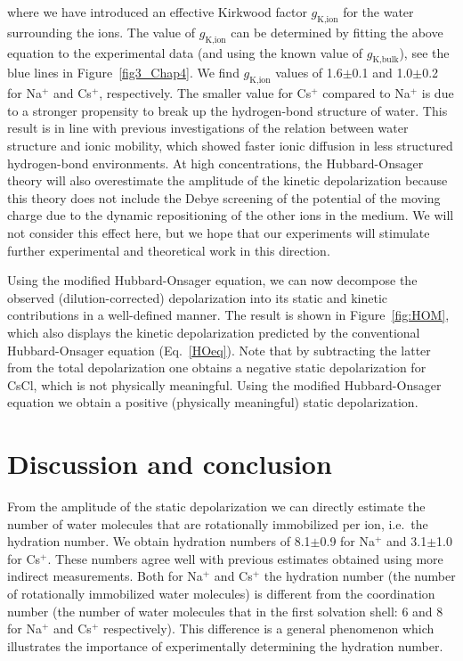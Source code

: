 where we have introduced an effective Kirkwood factor $g_\text{K,ion}$ for the water surrounding the ions. The value of $g_\text{K,ion}$ can be determined by fitting the above equation to the experimental data (and using the known value of $g_\text{K,bulk}$), see the blue lines in Figure~\ref{fig3_Chap4}. We find $g_\text{K,ion}$ values of 1.6$\pm$0.1 and 1.0$\pm$0.2 for Na$^+$ and Cs$^+$, respectively. The smaller value for Cs$^+$ compared to Na$^+$ is due to a stronger propensity to break up the hydrogen-bond structure of water. This result is in line with previous investigations of the relation between water structure and ionic mobility,\!\cite{Kay1966,Hertz1974,Hertz1976,Harris1978} which showed faster ionic diffusion in less structured hydrogen-bond environments. At high concentrations, the Hubbard-Onsager theory will also overestimate the amplitude of the kinetic depolarization because this theory does not include the Debye screening of the potential of the moving charge due to the dynamic repositioning of the other ions in the medium. We will not consider this effect here, but we hope that our experiments will stimulate further experimental and theoretical work in this direction.






Using the modified Hubbard-Onsager equation, we can now decompose the observed (dilution-corrected) depolarization into its static and kinetic contributions in a well-defined manner. The result is shown in Figure~\ref{fig:HOM}, which also displays the kinetic depolarization predicted by the conventional Hubbard-Onsager equation (Eq.~\ref{HOeq}). Note that by subtracting the latter from the total depolarization one obtains a negative static depolarization for CsCl, which is not physically meaningful. Using the modified Hubbard-Onsager equation we obtain a positive (physically meaningful) static depolarization.




\section{Discussion and conclusion}


From the amplitude of the static depolarization we can directly estimate the number of water molecules that are rotationally immobilized per ion, i.e.\ the hydration number.\!\cite{Barthel1992} We obtain hydration numbers of 8.1$\pm$0.9 for Na$^+$ and 3.1$\pm$1.0 for Cs$^+$. These numbers agree well with previous estimates obtained using more indirect measurements.\!\cite{Richens1997} Both for Na$^+$ and Cs$^+$ the hydration number (the number of rotationally immobilized water molecules) is different from the coordination number (the number of water molecules that in the first solvation shell: 6 and 8 for Na$^+$ and Cs$^+$ respectively).\!\cite{Ohtaki1993,White2000,Varma2006,Mason2006,Rowley2012} This difference is a general phenomenon\!\cite{Barthel1992} which illustrates the importance of experimentally determining the hydration number.

